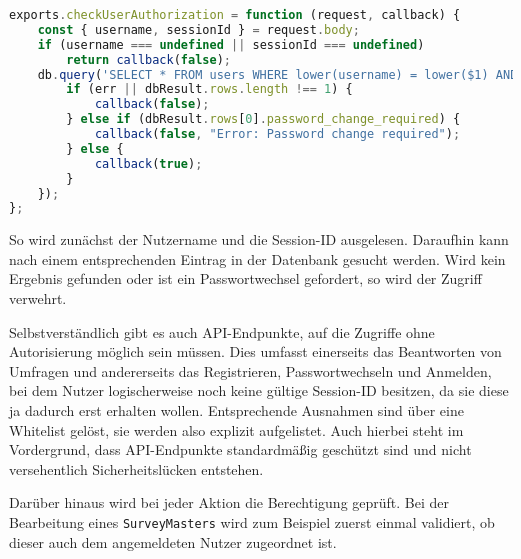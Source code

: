 \begin{lstlisting}[language=javascript, caption={Standardmäßige Authentifizierung}, label={lst:implementation-server-auth-check}]
exports.checkUserAuthorization = function (request, callback) {
	const { username, sessionId } = request.body;
	if (username === undefined || sessionId === undefined)
		return callback(false);
	db.query('SELECT * FROM users WHERE lower(username) = lower($1) AND session_id = $2;', [username, sessionId], (err, dbResult) => {
		if (err || dbResult.rows.length !== 1) {
			callback(false);
		} else if (dbResult.rows[0].password_change_required) {
			callback(false, "Error: Password change required");
		} else {
			callback(true);
		}
	});
};
\end{lstlisting}

So wird zunächst der Nutzername und die Session-ID ausgelesen.
Daraufhin kann nach einem entsprechenden Eintrag in der Datenbank gesucht werden.
Wird kein Ergebnis gefunden oder ist ein Passwortwechsel gefordert, so wird der Zugriff verwehrt.

Selbstverständlich gibt es auch \acs{API}-Endpunkte, auf die Zugriffe ohne Autorisierung möglich sein müssen.
Dies umfasst einerseits das Beantworten von Umfragen und andererseits das Registrieren, Passwortwechseln und Anmelden, bei dem Nutzer logischerweise noch keine gültige Session-ID besitzen, da sie diese ja dadurch erst erhalten wollen.
Entsprechende Ausnahmen sind über eine Whitelist gelöst, sie werden also explizit aufgelistet.
Auch hierbei steht im Vordergrund, dass \acs{API}-Endpunkte standardmäßig geschützt sind und nicht versehentlich Sicherheitslücken entstehen.

Darüber hinaus wird bei jeder Aktion die Berechtigung geprüft.
Bei der Bearbeitung eines \texttt{SurveyMasters} wird zum Beispiel zuerst einmal validiert, ob dieser auch dem angemeldeten Nutzer zugeordnet ist.
